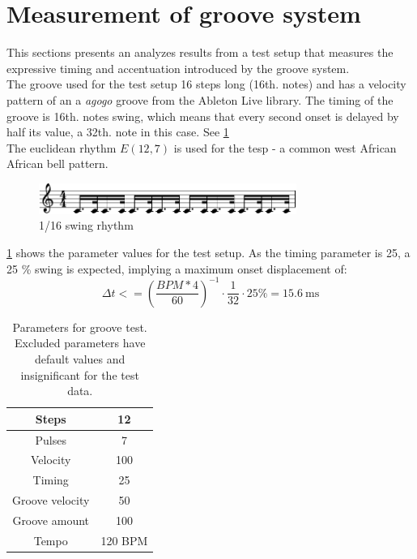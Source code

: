 
\section{Measurement of groove system}
\label{sec:groove_results}
This sections presents an analyzes results from a test setup that measures the expressive timing and accentuation introduced by the groove system.\\ The groove used for the test setup 16 steps long (16th. notes) and has a velocity pattern of an a \textit{agogo} groove from the Ableton Live library. The timing of the groove is 16th. notes swing, which means that every second onset is delayed by half its value, a 32th. note in this case. See \cref{fig:swing} \\
The euclidean rhythm $E(12,7)$ is used for the tesp - a common west African African bell pattern. \cite{Toussaint2005TheEA}

\begin{figure}[H]
    \centering
    \includegraphics[width=0.75\textwidth]{graphics/swing.pdf}
    \caption{1/16 swing rhythm}
    \label{fig:swing}
\end{figure}

\cref{tab:param_groove} shows the parameter values for the test setup. As the timing parameter is 25, a 25 \% swing is expected, implying a maximum onset displacement of: 
$$\Delta t <= (\frac{BPM*4}{60})^{-1} \cdot \frac{1}{32} \cdot 25 \% = \SI{15.6}{\milli\second}$$


\begin{table}[]
    \centering
    \begin{tabular}{c|c}
        Steps & 12 \\
        \hline
        Pulses & 7 \\
        \hline
        Velocity & 100 \\
        \hline
        Timing & 25 \\
        \hline
        Groove velocity & 50 \\
        \hline
        Groove amount & 100\\
        \hline
        Tempo & 120 BPM \\
    \end{tabular}
    \caption{Parameters for groove test. Excluded parameters have default values and insignificant for the test data. }
    \label{tab:param_groove}
\end{table}

